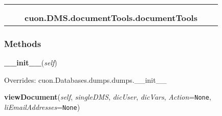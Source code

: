     \label{cuon:DMS:documentTools:documentTools}
\begin{tabular}{cccccc}
\multicolumn{2}{r}{\settowidth{\BCL}{cuon.Databases.dumps.dumps}\multirow{2}{\BCL}{cuon.Databases.dumps.dumps}}
&&
  \\\cline{3-3}
  &&\multicolumn{1}{c|}{}
&&
  \\
&&\multicolumn{2}{l}{\textbf{cuon.DMS.documentTools.documentTools}}
\end{tabular}



  \subsubsection{Methods}

    \vspace{0.5ex}

\hspace{.8\funcindent}\begin{boxedminipage}{\funcwidth}

    \raggedright \textbf{\_\_init\_\_}(\textit{self})

\setlength{\parskip}{2ex}
\setlength{\parskip}{1ex}
      Overrides: cuon.Databases.dumps.dumps.\_\_init\_\_

    \end{boxedminipage}

    \label{cuon:DMS:documentTools:documentTools:viewDocument}

    \vspace{0.5ex}

\hspace{.8\funcindent}\begin{boxedminipage}{\funcwidth}

    \raggedright \textbf{viewDocument}(\textit{self}, \textit{singleDMS}, \textit{dicUser}, \textit{dicVars}, \textit{Action}={\tt None}, \textit{liEmailAddresses}={\tt None})

\setlength{\parskip}{2ex}
\setlength{\parskip}{1ex}
    \end{boxedminipage}

